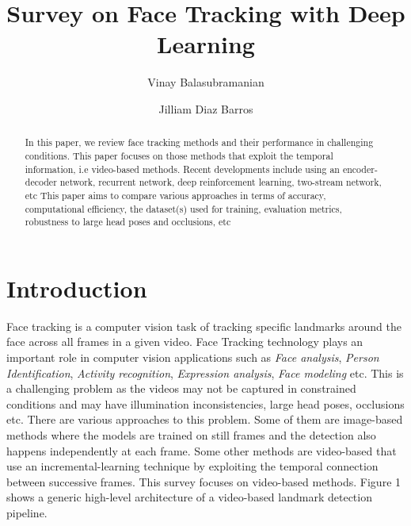 \documentclass{llncs}
\begin{document}
\pagestyle{headings}  %

%
\title{Survey on Face Tracking with Deep Learning}
%
%
\author{Vinay Balasubramanian \and Jilliam Diaz Barros}
%
%

\maketitle              %

\begin{abstract}
In this paper, we review face tracking methods and their performance in challenging conditions. This paper focuses on those methods that exploit the temporal information, i.e video-based methods. Recent developments include using an encoder-decoder network, recurrent network, deep reinforcement learning, two-stream network, etc This paper aims to compare various approaches in terms of accuracy, computational efficiency, the dataset(s) used for training, evaluation metrics, robustness to large head poses and occlusions, etc
\end{abstract}


\section{Introduction}
Face tracking is a computer vision task of tracking specific landmarks around the face across all frames in a given video.
Face Tracking technology plays an important role in computer vision applications such as \textit{Face analysis}, \textit{Person Identification}, \textit{Activity recognition}, \textit{Expression analysis}, \textit{Face modeling} etc. This is a challenging problem as the videos may not be captured in constrained conditions and may have illumination inconsistencies, large head poses, occlusions etc.
There are various approaches to this problem. Some of them are image-based methods where the models are trained on still frames and the detection also happens independently at each frame. Some other methods are video-based that use an incremental-learning technique by exploiting the temporal connection between successive frames. This survey focuses on video-based methods. Figure 1 shows a generic high-level architecture of a video-based landmark detection pipeline.
\end{document}

